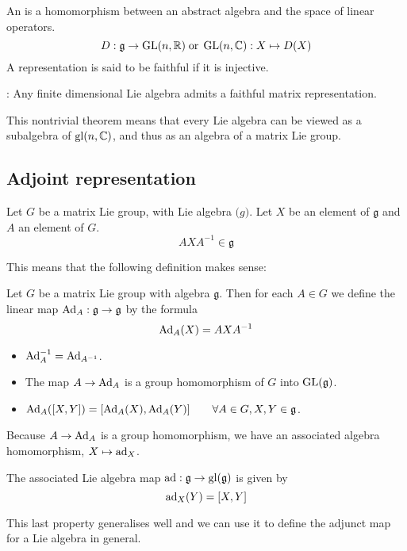 \begin{definition}
An  is a homomorphism between an abstract algebra and the space of linear operators.
\[ D: \mathfrak{g} \to \operatorname{GL}(n,\mathbb{R}) \; \text{or} \; \operatorname{GL}(n,\mathbb{C}): X \mapsto D(X) \]
A representation is said to be faithful if it is injective.
\end{definition}

\begin{eigenschap}
:
Any finite dimensional Lie algebra admits a faithful matrix representation.
\end{eigenschap}
This nontrivial theorem means that every Lie algebra can be viewed as a subalgebra of $\operatorname{gl}(n,\mathbb{C})$, and thus as an algebra of a matrix Lie group.

\subsection{Adjoint representation}

\begin{eigenschap}
Let $G$ be a matrix Lie group, with Lie algebra $\mathfrak(g)$. Let $X$ be an element of $\mathfrak{g}$ and $A$ an element of $G$.
\[ AXA^{-1} \in \mathfrak{g} \]
\end{eigenschap}
This means that the following definition makes sense:
\begin{definition}
Let $G$ be a matrix Lie group with algebra $\mathfrak{g}$. Then for each $A \in G$ we define the linear map $\operatorname{Ad}_A: \mathfrak{g} \to \mathfrak{g}$ by the formula
\[ \operatorname{Ad}_A(X) = AXA^{-1} \]
\end{definition}
\begin{eigenschap}
\begin{itemize}
\item $\operatorname{Ad}_A^{-1} = \operatorname{Ad}_{A^{-1}}$.
\item The map $A \to \operatorname{Ad}_A$ is a group homomorphism of $G$ into $\operatorname{GL}(\mathfrak{g})$.
\item $\operatorname{Ad}_A([X,Y]) = [\operatorname{Ad}_A(X),\operatorname{Ad}_A(Y)] \qquad \forall A\in G, X,Y \in \mathfrak{g}$.
\end{itemize}
\end{eigenschap}
Because $A \to \operatorname{Ad}_A$ is a group homomorphism, we have an associated algebra homomorphism, $X \mapsto \operatorname{ad}_X$.
\begin{eigenschap}
The associated Lie algebra map $\operatorname{ad}: \mathfrak{g} \to \operatorname{gl}(\mathfrak{g})$ is given by
\[ \operatorname{ad}_X(Y) = [X,Y] \]
\end{eigenschap}
This last property generalises well and we can use it to define the adjunct map for a Lie algebra in general.

